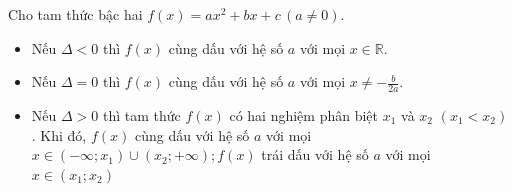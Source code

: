 \begin{dl}
	Cho tam thức bậc hai $f(x)=ax^2+b x+c\,(a \neq 0)$.
	\begin{itemize}
		\item Nếu $\Delta<0$ thì $f(x)$ cùng dấu với hệ số $a$ với mọi $x \in \mathbb{R}$.
		\item Nếu $\Delta=0$ thì $f(x)$ cùng dấu với hệ số $a$ với mọi $x \neq-\frac{b}{2 a}$.
		\item Nếu $\Delta>0$ thì tam thức $f(x)$ có hai nghiệm phân biệt $x_1$ và $x_2$ $\left(x_{1}<x_{2}\right)$. Khi đó, $f(x)$ cùng dấu với hệ số $a$ với mọi $x \in\left(-\infty ; x_{1}\right) \cup\left(x_{2} ;+\infty\right) ; f(x)$ trái dấu với hệ số $a$ với mọi $x \in\left(x_{1} ; x_{2}\right)$
	\end{itemize}
\end{dl}

